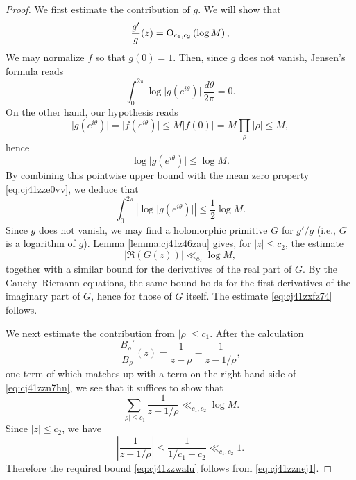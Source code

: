\documentclass[reqno]{amsart} 
\begin{document}
\begin{proof}
  We first estimate the contribution of $g$.  We will show that
  \begin{equation}\label{eq:cj41zxfz74}
    \frac{g'}{g}(z) = \operatorname{O}_{c_1, c_2} \left( \log M \right),
  \end{equation}
  We may normalize $f$ so that $g(0) = 1$.  Then, since $g$ does not vanish, Jensen's formula reads
  \begin{equation}\label{eq:cj41zze0vv}
    \int _{0}^{2 \pi} \log \lvert g(e^{i \theta}) \rvert \, \frac{d \theta }{2 \pi } = 0.
  \end{equation}
  On the other hand, our hypothesis reads
  \begin{equation*}
    \lvert g(e^{i \theta}) \rvert = \lvert f(e^{i \theta}) \rvert \leq M \lvert f(0) \rvert = M \prod_{\rho} |\rho| \leq M,
  \end{equation*}
  hence
  \begin{equation*}
    \log \lvert g(e^{i \theta}) \rvert \leq \log M.
  \end{equation*}
  By combining this pointwise upper bound with the mean zero property \eqref{eq:cj41zze0vv}, we deduce that
  \begin{equation*}
    \int_0^{2 \pi } \left\lvert
      \log \lvert g (e^{i \theta }) \rvert
    \right\rvert
    \leq \frac{1}{2} \log M.
  \end{equation*}
  Since $g$ does not vanish, we may find a holomorphic primitive $G$ for $g'/g$ (i.e., $G$ is a logarithm of $g$).  Lemma \ref{lemma:cj41z46zau} gives, for $\lvert z \rvert \leq c_2$, the estimate
  \begin{equation*}
    \lvert \Re(G(z)) \rvert \ll_{c_2} \log  M,
  \end{equation*}
  together with a similar bound for the derivatives of the real part of $G$.  By the Cauchy--Riemann equations, the same bound holds for the first derivatives of the imaginary part of $G$, hence for those of $G$ itself.  The estimate \eqref{eq:cj41zxfz74} follows.

  We next estimate the contribution from $\lvert \rho \rvert \leq c_1$.  After the calculation
  \begin{equation}\label{eq:cj41z21ka5}
    \frac{B_\rho '}{B_\rho }(z) = \frac{1}{z - \rho } - \frac{1}{z - 1 / \bar{\rho }},
  \end{equation}
  one term of which matches up with a term on the right hand side of \eqref{eq:cj41zzn7hn}, we see that it suffices to show that
  \begin{equation}\label{eq:cj41zzwalu}
    \sum_{\lvert \rho \rvert \leq c_1} \frac{1}{z - 1 / \bar{\rho }} \ll_{c_1, c_2} \log M.
  \end{equation}
  Since $\lvert z \rvert \leq c_2$, we have
  \begin{equation*}
    \left\lvert \frac{1}{z - 1 / \bar{\rho }} \right\rvert \leq \frac{1}{1/c_1 - c_2} \ll_{c_1,c_2} 1.
  \end{equation*}
  Therefore the required bound \eqref{eq:cj41zzwalu} follows from \eqref{eq:cj41zznej1}.


\end{proof}
\end{document}

